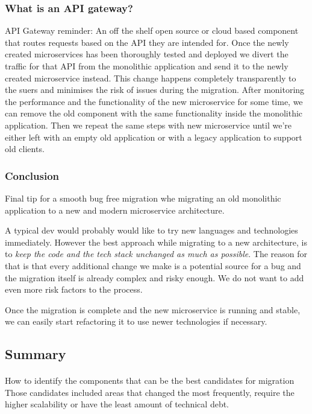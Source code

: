 \subsubsection{What is an API gateway?}
API Gateway reminder: An off the shelf open source or cloud based component that routes requests based on the API they are intended for.
Once the newly created microservices has been thoroughly tested and deployed we divert the traffic for that API from the monolithic application and send it to the newly created microservice instead.
This change happens completely transparently to the suers and minimises the risk of issues during the migration.
After monitoring the performance and the functionality of the new microservice for some time, we can remove the old component with the same functionality inside the monolithic application.
Then we repeat the same steps with new microservice until we're either left with an empty old application or with a legacy application to support old clients.

\subsubsection{Conclusion}
Final tip for a smooth bug free migration whe migrating an old monolithic application to a new and modern microservice architecture.

A typical dev would probably would like to try new languages and technologies immediately.
However the best approach while migrating to a new architecture, is to \textit{keep the code and the tech stack unchanged as much as possible}.
The reason for that is that every additional change we make is a potential source for a bug and the migration itself is already complex and risky enough.
We do not want to add even more risk factors to the process.

Once the migration is complete and the new microservice is running and stable, we can easily start refactoring it to use newer technologies if necessary.

\subsection{Summary}

\paragraph{}
How to identify the components that can be the best candidates for migration
Those candidates included areas that changed the most frequently, require the higher scalability or have the least amount of technical debt.

